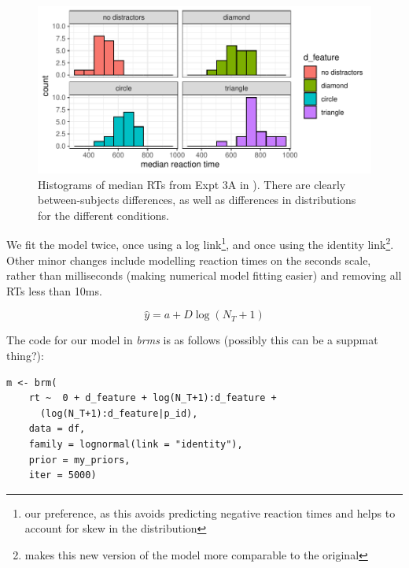 \documentclass[smallextended]{svjour3}       %
\begin{document}
\begin{figure}
\centering
\includegraphics[width=\textwidth]{../plots/histograms_of_rt.pdf}
\caption{Histograms of median RTs from Expt 3A in \cite{buetti2019predicting}). There are clearly between-subjects differences, as well as differences in distributions for the different conditions.}
\label{fig:buetti2019_hist}
\end{figure}

We fit the model twice, once using a log link\footnote{our preference, as this avoids predicting negative reaction times and helps to account for skew in the distribution}, and once using the identity link\footnote{makes this new version of the model more comparable to the original}. Other minor changes include modelling reaction times on the seconds scale, rather than milliseconds (making numerical model fitting easier) and removing all RTs less than 10ms.

\begin{equation}
\hat{y} = a + D\log(N_T + 1)
\label{eq:computeDlm}
\end{equation}

The code for our model in \textit{brms} is as follows (possibly this can be a suppmat thing?):

\begin{verbatim}
m <- brm(
    rt ~  0 + d_feature + log(N_T+1):d_feature + 
      (log(N_T+1):d_feature|p_id),
    data = df,
    family = lognormal(link = "identity"),
    prior = my_priors,
    iter = 5000)
\end{verbatim}
\end{document}
